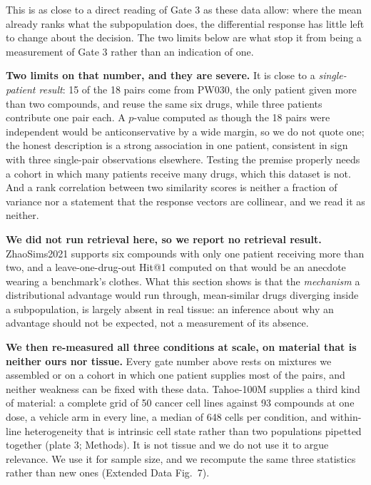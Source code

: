 \documentclass[11pt,letterpaper]{article}
\begin{document}
This is as close to a direct reading of
Gate 3 as these data allow: where the mean already ranks what the subpopulation does, the
differential response has little left to change about the decision. The two limits below are what
stop it from being a measurement of Gate 3 rather than an indication of one.

\textbf{Two limits on that number, and they are severe.} It is close to a \emph{single-patient
result}: 15 of the 18 pairs come from PW030, the only patient given more than two compounds, and
reuse the same six drugs, while three patients contribute one pair each. A $p$-value computed as
though the 18 pairs were independent would be anticonservative by a wide margin, so we do not quote
one; the honest description is a strong association in one patient, consistent in sign with three
single-pair observations elsewhere. Testing the premise properly needs a cohort in which many
patients receive many drugs, which this dataset is not. And a rank correlation between two
similarity scores is neither a fraction of variance nor a statement that the response vectors are
collinear, and we read it as neither.

\textbf{We did not run retrieval here, so we report no retrieval result.} ZhaoSims2021 supports six
compounds with only one patient receiving more than two, and a leave-one-drug-out Hit@1 computed on
that would be an anecdote wearing a benchmark's clothes. What this section shows is that the
\emph{mechanism} a distributional advantage would run through, mean-similar drugs diverging inside
a subpopulation, is largely absent in real tissue: an inference about why an advantage should not
be expected, not a measurement of its absence.

\textbf{We then re-measured all three conditions at scale, on material that is neither ours nor
tissue.} Every gate number above rests on mixtures we assembled or on a cohort in which one
patient supplies most of the pairs, and neither weakness can be fixed with these data. Tahoe-100M
supplies a third kind of material: a complete grid of 50 cancer cell lines against 93 compounds at
one dose, a vehicle arm in every line, a median of 648 cells per condition, and within-line
heterogeneity that is intrinsic cell state rather than two populations pipetted together (plate 3;
Methods). It is not tissue and we do not use it to argue relevance. We use it for sample size, and
we recompute the same three statistics rather than new ones (Extended Data Fig.~7).
\end{document}
